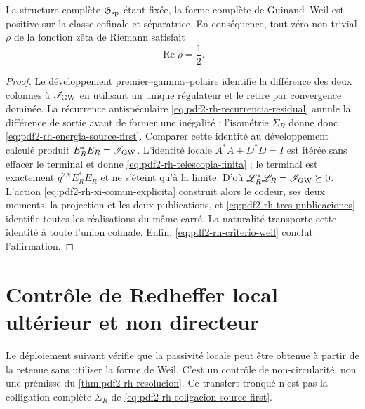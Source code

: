 \begin{theorem}
\label{thm:pdf2-rh-resolucion}
La structure complète
\(\mathfrak G_{\rm sp}\) étant fixée, la forme
complète de Guinand--Weil est positive sur la classe cofinale et séparatrice. En
conséquence, tout zéro non trivial \(\rho\) de la fonction zêta de Riemann
satisfait
\[
 \boxed{\operatorname{Re}\rho=\frac12.}
\]
\end{theorem}

\begin{proof}
Le développement premier--gamma--polaire identifie la différence des deux colonnes
à \(\mathscr I_{\rm GW}\) en utilisant un unique régulateur et le retire par
convergence dominée. La récurrence antispéculaire
\eqref{eq:pdf2-rh-recurrencia-residual} annule la différence de sortie avant de
former une inégalité ; l'isométrie \(\Sigma_R\) donne donc
\eqref{eq:pdf2-rh-energia-source-first}. Comparer cette identité au
développement calculé produit
\(E_R^*E_R=\mathscr I_{\rm GW}\). L'identité locale
\(A^*A+D^*D=I\) est itérée sans effacer le terminal et donne
\eqref{eq:pdf2-rh-telescopia-finita} ; le terminal est exactement
\(q^{2N}E_R^*E_R\) et ne s'éteint qu'à la limite. D'où
\(\mathscr L_R^*\mathscr L_R=\mathscr I_{\rm GW}\succeq0\).
L'action
\eqref{eq:pdf2-rh-xi-comun-explicita} construit alors le codeur, ses
deux moments, la projection et les deux publications, et
\eqref{eq:pdf2-rh-tres-publicaciones} identifie toutes les réalisations du
même carré. La naturalité transporte cette identité à toute l'union
cofinale. Enfin,
\eqref{eq:pdf2-rh-criterio-weil} conclut l'affirmation.
\end{proof}

\section{Contrôle de Redheffer local ultérieur et non directeur}

Le déploiement suivant vérifie que la passivité locale peut être obtenue à partir de
la retenue sans utiliser la forme de Weil. C'est un contrôle de non-circularité, non une
prémisse du \cref{thm:pdf2-rh-resolucion}. Ce transfert tronqué n'est pas
la colligation complète \(\Sigma_R\) de
\eqref{eq:pdf2-rh-coligacion-source-first}.

